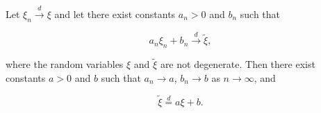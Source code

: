Let $\xi_n \xrightarrow{d} \xi$ and let there exist constants $a_n > 0$ and $b_n$ such that

$$a_n \xi_n + b_n \xrightarrow{d} \tilde{\xi},$$

where the random variables $\xi$ and $\tilde{\xi}$ are not degenerate. Then there exist constants $a > 0$ and $b$ such that $a_n \to a$, $b_n \to b$ as $n \to \infty$, and

$$\tilde{\xi} \stackrel{d}{=} a \xi + b.$$
